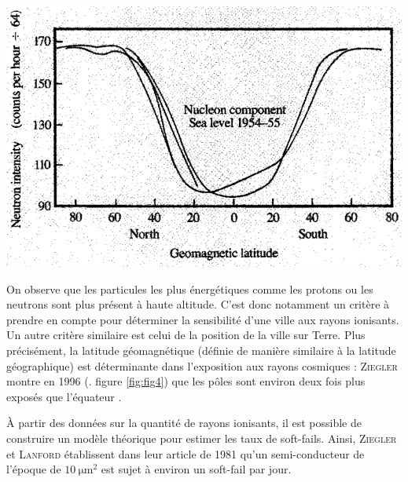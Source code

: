\documentclass[a4paper,french,bookmarks]{article}
\begin{document}
\begin{center}
\begin{minipage}{0.4\linewidth}
            \label{fig:fig3}
        \end{minipage}
        \begin{minipage}{0.1\linewidth}
            \hfill
        \end{minipage}
        \begin{minipage}{0.4\linewidth}
            \includegraphics[scale=0.6]{../Images/latitude.png}

            \label{fig:fig4}
        \end{minipage}
        
        
    \end{center}
    On observe que les particules les plus énergétiques comme les protons ou les neutrons sont plus présent à haute altitude\cite{nappa2021dejavu, ziegler96}. C'est donc notamment un critère à prendre en compte pour déterminer la sensibilité d'une ville aux rayons ionisants. Un autre critère similaire est celui de la position de la ville sur Terre. Plus précisément, la latitude géomagnétique (définie de manière similaire à la latitude géographique) est déterminante dans l'exposition aux rayons cosmiques : \textsc{Ziegler} montre en 1996 (\cf. figure \ref{fig:fig4}) que les pôles sont environ deux fois plus exposés que l'équateur \cite{ziegler96}.

    À partir des données sur la quantité de rayons ionisants, il est possible de construire un modèle théorique pour estimer les taux de soft-fails. Ainsi, \textsc{Ziegler} et \textsc{Lanford} établissent dans leur article de 1981 \cite{ziegler81} qu'un semi-conducteur de l'époque de $\qty{10}{\micro\meter\squared}$ est sujet à environ un soft-fail par jour.
    
\end{document}
